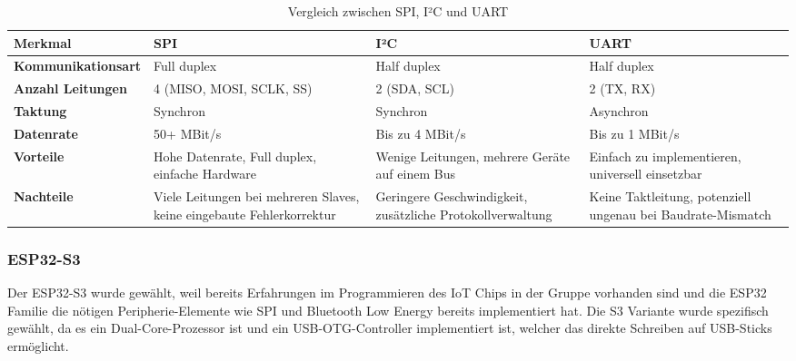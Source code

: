 \begin{table}[ht]
\renewcommand{\arraystretch}{1.5} %
\centering
\begin{tabular}{@{}p{3.4cm}p{3.2cm}p{3.2cm}p{3.2cm}@{}}
\toprule
\textbf{Merkmal}        & \textbf{SPI} & \textbf{I²C} & \textbf{UART} \\ \midrule
\textbf{Kommunikationsart} & Full duplex & Half duplex & Half duplex \\
\textbf{Anzahl Leitungen} & 4 (MISO, MOSI, SCLK, SS) & 2 (SDA, SCL) & 2 (TX, RX) \\
\textbf{Taktung}        & Synchron & Synchron & Asynchron \\
\textbf{Datenrate}      & 50+ MBit/s & Bis zu 4 MBit/s & Bis zu 1 MBit/s \\
\textbf{Vorteile}       & Hohe Datenrate, Full duplex, einfache Hardware & Wenige Leitungen, mehrere Geräte auf einem Bus & Einfach zu implementieren, universell einsetzbar \\
\textbf{Nachteile}      & Viele Leitungen bei mehreren Slaves, keine eingebaute Fehlerkorrektur & Geringere Geschwindigkeit, zusätzliche Protokollverwaltung & Keine Taktleitung, potenziell ungenau bei Baudrate-Mismatch \\
\bottomrule
\end{tabular}
\caption{Vergleich zwischen SPI, I²C und UART}
\label{tab:spi_vergleich}
\end{table}

\subsubsection{ESP32-S3}
Der ESP32-S3 wurde gewählt, weil bereits Erfahrungen im Programmieren des IoT Chips in der Gruppe vorhanden sind und die ESP32 Familie die nötigen Peripherie-Elemente wie SPI und Bluetooth Low Energy bereits implementiert hat. Die S3 Variante wurde spezifisch gewählt, da es ein Dual-Core-Prozessor ist und ein USB-OTG-Controller implementiert ist, welcher das direkte Schreiben auf USB-Sticks ermöglicht. 

